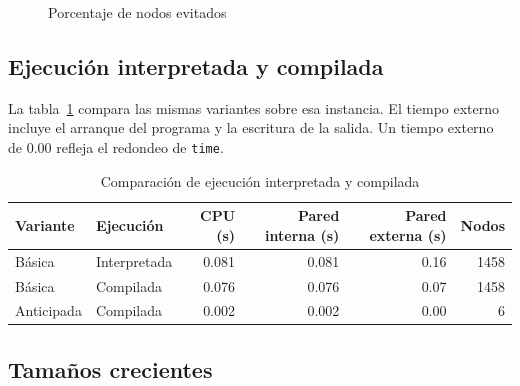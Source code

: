 \documentclass[11pt]{article}
\begin{document}
\begin{figure}[htbp]
    \centering
    \caption{Porcentaje de nodos evitados}
    \label{fig-poda}
\end{figure}
\FloatBarrier

\subsection{Ejecución interpretada y compilada}

La tabla~\ref{tab-nativa} compara las mismas variantes sobre esa instancia. El tiempo externo incluye el arranque del programa y la escritura de la salida. Un tiempo externo de 0.00 refleja el redondeo de \texttt{time}.

\begin{table}[htbp]
    \centering
    \begin{tabular}{l|l|r|r|r|r}
        \hline
        Variante & Ejecución & CPU (s) & Pared interna (s) & Pared externa (s) & Nodos \\
        \hline
Básica & Interpretada & 0.081 & 0.081 & 0.16 & 1458 \\
Básica & Compilada & 0.076 & 0.076 & 0.07 & 1458 \\
Anticipada & Compilada & 0.002 & 0.002 & 0.00 & 6 \\
        \hline
    \end{tabular}
    \caption{Comparación de ejecución interpretada y compilada}
    \label{tab-nativa}
\end{table}
\FloatBarrier

\subsection{Tamaños crecientes}
\end{document}
